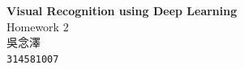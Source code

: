 \documentclass[12pt, a4paper]{article}
\begin{document}
\begin{center}
    \LARGE \textbf{Visual Recognition using Deep Learning}\\[0.4em]
    \large Homework 2\\
    \large 吳念澤\\
    \vspace{0.5em}
    \normalsize \texttt{314581007}
\end{center}

\vspace{1em}






\begingroup
\footnotesize


\endgroup
\end{document}
